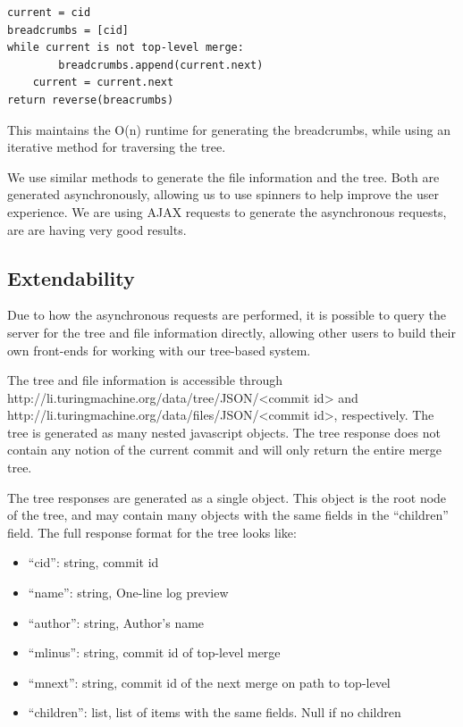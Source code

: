 \documentclass[conference, draftclsnofoot]{IEEEtran}
\begin{document}
\begin{verbatim}
current = cid
breadcrumbs = [cid]
while current is not top-level merge:
        breadcrumbs.append(current.next)
	current = current.next
return reverse(breacrumbs)
\end{verbatim}

This maintains the O(n) runtime for generating the breadcrumbs, while using an
iterative method for traversing the tree.

We use similar methods to generate the file information and the tree. Both are
generated asynchronously, allowing us to use spinners to help improve the user
experience. We are using AJAX requests to generate the asynchronous requests,
are are having very good results.

\subsection{Extendability}
Due to how the asynchronous requests are performed, it is possible to query the
server for the tree and file information directly, allowing other users to
build their own front-ends for working with our tree-based system.

The tree and file information is accessible through
http://li.turingmachine.org/data/tree/JSON/<commit id> and
http://li.turingmachine.org/data/files/JSON/<commit id>, respectively.
The tree is generated as many nested javascript objects. The tree response does
not contain any notion of the current commit and will only return the entire
merge tree.

The tree responses are generated as a single object. This object is the root
node of the tree, and may contain many objects with the same fields in the
``children'' field. The full response format for the tree looks like:

\begin{itemize}
        \item ``cid'': string, commit id
        \item ``name'': string, One-line log preview
        \item ``author'': string, Author's name
        \item ``mlinus'': string, commit id of top-level merge
        \item ``mnext'': string, commit id of the next merge on path to
                top-level
        \item ``children'': list, list of items with the same fields. Null if
                no children
\end{itemize}
\end{document}

